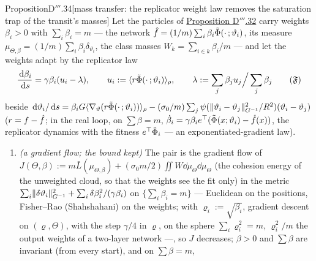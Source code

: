 \begin{thm}{Proposition}{D$'''$.34}[mass transfer: the replicator weight law removes the saturation trap of the
transit's masses]\label{res:thmDppp:34}%
Let the particles of \hyperref[res:thmDppp:32]{Proposition D$'''$.32} carry weights $\beta_i > 0$ with
$\sum_i\beta_i = m$ --- the network $\hat f = (1/m)\sum_i\beta_i\tilde\Phi(\cdot\,;\vartheta_i)$, its measure
$\mu_{\Theta,\beta} = (1/m)\sum_i\beta_i\delta_{\vartheta_i}$, the class masses $W_k = \sum_{i\in k}\beta_i/m$ --- and
let the weights adapt by the replicator law
\begin{equation}
  \frac{\dd\beta_i}{\dd s} = \gamma\beta_i(u_i - \lambda),\qquad
  u_i := \langle r\tilde\Phi(\cdot\,;\vartheta_i)\rangle_\rho,\qquad
  \lambda := \sum_j\beta_ju_j\Big/\sum_j\beta_j
  \tag{$\mathfrak{F}$}
\end{equation}
beside
$\,\mathrm{d}\vartheta_i/\,\mathrm{d} s = \beta_iG\langle\nabla_\vartheta(r\tilde\Phi(\cdot\,;\vartheta_i))\rangle_\rho
- (\sigma_0/m)\sum_j\psi(\lVert \vartheta_i - \vartheta_j\rVert^2_{G^{-1}}/R^2)(\vartheta_i - \vartheta_j)$
($r = f - \hat f$; in the real loop, on $\sum\beta = m$,
$\dot\beta_i = \gamma\beta_ie^\top(\tilde\Phi(x;\vartheta_i) - \hat f(x))$, the replicator dynamics with the fitness
$e^\top\tilde\Phi_i$ --- an exponentiated-gradient law).
\begin{enumerate}[label=\textup{(\roman*)}]
  \item \emph{(a gradient flow; the bound kept)} The pair is the gradient flow of
    $J(\Theta,\beta) := m\bar L(\mu_{\Theta,\beta}) + (\sigma_0m/2)\iint W\dd\mu_\Theta\dd\mu_\Theta$ (the cohesion
    energy of the unweighted cloud, so that the weights see the fit only) in the metric
    $\sum_i\lVert \delta\vartheta_i\rVert^2_{G^{-1}} + \sum_i\delta\beta_i^2/(\gamma\beta_i)$ on $\{\sum_i\beta_i = m\}$ ---
    Euclidean on the positions, Fisher--Rao (Shahshahani) on the weights; with $\varrho_i := \sqrt{\beta_i}$,
    gradient descent on $(\varrho,\Theta)$, with the step $\gamma/4$ in $\varrho$, on the sphere
    $\sum_i\varrho_i^2 = m$, $\varrho_i^2/m$ the output weights of a two-layer network ---, so $J$ decreases;
    $\beta > 0$ and $\sum\beta$ are invariant (from every start), and on $\sum\beta = m$,

\end{enumerate}
\end{thm}
